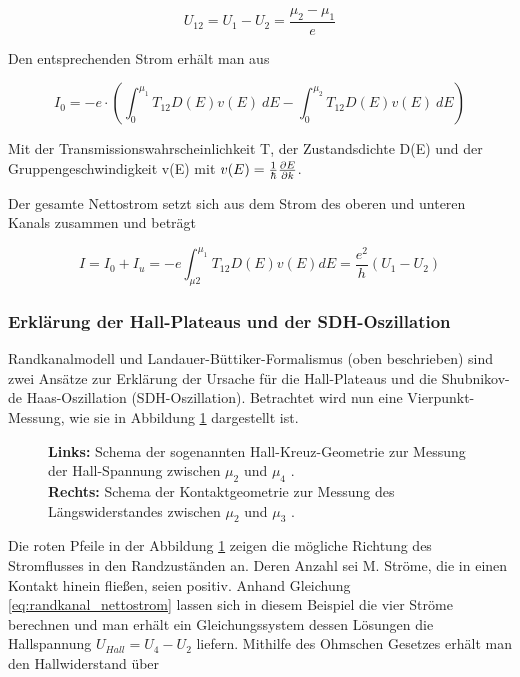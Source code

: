 \begin{equation}
U_{12}=U_1 - U_2= \frac{\mu_2-\mu_1}{e}
\label{eq:spannung_randkanal}
\end{equation}

Den entsprechenden Strom erhält man aus 

\begin{equation}
I_0=-e \cdot \left( \int^{\mu_1}_0T_{12}D(E)v(E)~dE-\int^{\mu_2}_0T_{12}D(E)v(E)~dE \right)
\label{eq:strom_randkanal}
\end{equation}

Mit der Transmissionswahrscheinlichkeit T, der Zustandsdichte D(E)
und der Gruppengeschwindigkeit v(E) mit $v(E)=\frac{1}{\hbar}\frac{\partial E}{\partial k}$.

Der gesamte Nettostrom setzt sich aus dem Strom des oberen und unteren Kanals zusammen und beträgt

\begin{equation}
I=I_0+I_u=-e\int^{\mu_1}_{\mu2}T_{12}D(E)v(E)dE=\frac{e^2}{h}(U_1-U_2)
\label{eq:randkanal_nettostrom}
\end{equation}
 

\subsubsection{Erklärung der Hall-Plateaus und der SDH-Oszillation}

Randkanalmodell und Landauer-Büttiker-Formalismus (oben beschrieben) sind zwei Ansätze zur Erklärung der Ursache für die Hall-Plateaus und die Shubnikov-de Haas-Oszillation (SDH-Oszillation). 
Betrachtet wird nun eine Vierpunkt-Messung, wie sie in Abbildung \ref{fig:Vierpunktmessung_Anleitungsheft} dargestellt ist. 

\begin{figure}[h]
\centering
	\caption[Vierpunkt-Messung]{
		\textbf{Links:} Schema der sogenannten Hall-Kreuz-Geometrie zur Messung der Hall-Spannung zwischen $\mu_2$ und $\mu_4$ \cite{anleitung}.\\
		\textbf{Rechts:} Schema der Kontaktgeometrie zur Messung des Längswiderstandes zwischen $\mu_2$ und $\mu_3$ \cite{anleitung}.}
	\label{fig:Vierpunktmessung_Anleitungsheft}
\end{figure}

Die roten Pfeile in der Abbildung \ref{fig:Vierpunktmessung_Anleitungsheft} zeigen die mögliche Richtung des Stromflusses in den Randzuständen an. Deren Anzahl sei M. Ströme, die in einen Kontakt hinein fließen, seien positiv. 
Anhand Gleichung \ref{eq:randkanal_nettostrom} lassen sich in diesem Beispiel die vier Ströme berechnen und man erhält ein Gleichungssystem dessen Lösungen die Hallspannung $U_{Hall}=U_4-U_2$ liefern. 
Mithilfe des Ohmschen Gesetzes erhält man den Hallwiderstand über

